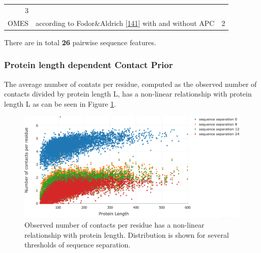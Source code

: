 \documentclass[12pt,a4paper,twoside]{book}
\theoremstyle{definition}
\theoremstyle{definition}
\theoremstyle{remark}
\begin{document}
\begin{longtable}[]{@{}rlc@{}}
\begin{minipage}[t]{0.18\columnwidth}
3\strut
\end{minipage}\tabularnewline
\begin{minipage}[t]{0.23\columnwidth}\raggedleft\strut
OMES\strut
\end{minipage} & \begin{minipage}[t]{0.50\columnwidth}\raggedright\strut
according to Fodor\&Aldrich
{[}\protect\hyperlink{ref-Fodor2004a}{141}{]} with and without APC\strut
\end{minipage} & \begin{minipage}[t]{0.18\columnwidth}\centering\strut
2\strut
\end{minipage}\tabularnewline
\bottomrule
\end{longtable}

There are in total \textbf{26} pairwise sequence features.

\subsubsection{Protein length dependent Contact
Prior}\label{contact-prior-protein-length}

The average number of contats per residue, computed as the observed
number of contacts divided by protein length L, has a non-linear
relationship with protein length L as can be seen in Figure
\ref{fig:avg-nr-contacts-per-residue-vs-protein-length}.






\begin{figure}

{\centering \includegraphics[width=0.8\linewidth]{img/random_forest_contact_prior/no_contacts_per_residue_vs_protein_length_thr8} 

}

\caption{Observed
number of contacts per residue has a non-linear relationship with
protein length. Distribution is shown for several thresholds of sequence
separation.}\label{fig:avg-nr-contacts-per-residue-vs-protein-length}
\end{figure}
\end{document}
